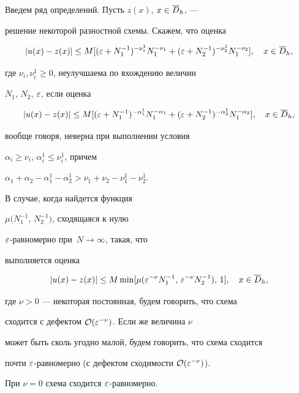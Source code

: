 Введем ряд определений. Пусть $z(x)$, $x\in\overline{D}_h$, ---


решение некоторой разностной схемы. Скажем, что оценка


$$


|u(x)-z(x)|\le M[(\eps+N_1^{-1})^{-\nu_1^1}


N_1^{-\nu_1}+(\eps+N_2^{-1})^{-\nu_2^1}N_1^{-\nu_2}],


\quad x\in\Dbh,


$$


где  $\nu_i, \nu^1_i \ge 0$, неулучшаема по вхождению величин


$N_1$, $N_2$, $\varepsilon$, если оценка


$$


|u(x)-z(x)|\le M[(\eps+N_1^{-1})^{-\alpha_1^1}


N_1^{-\alpha_1}+(\eps+N_2^{-1})^{-\alpha_2^1}N_1^{-\alpha_2}


], \quad x\in\Dbh,


$$


вообще говоря, неверна при выполнении условия


$\alpha_i\ge \nu_i$, $\alpha_i^1\le \nu_i^1$, причем


$\alpha_1+\alpha_2-\alpha_1^1-\alpha_2^1>


\nu_1+\nu_2-\nu_1^1-\nu_2^1$.


В случае, когда найдется функция


$\mu\big(N_1^{-1},\,N_2^{-1}\big)$, сходящаяся к нулю


$\varepsilon$-равномерно при $\,N\to\infty$, такая, что


выполняется оценка


$$


|u(x)-z(x)|\le M\min[


\mu(\eps^{-\nu} N_1^{-1}, \, \eps^{-\nu} N_2^{-1}),\,


1], \quad x\in\Dbh,


$$


где $\nu>0$ --- некоторая постоянная, будем говорить, что схема


сходится с дефектом ${\cal O} (\varepsilon^{-\nu})$. Если же величина $\nu$


может быть сколь угодно малой, будем говорить, что схема сходится


почти $\varepsilon$-равномерно (с дефектом сходимости ${\cal O} (\varepsilon^{-\nu})$).


При $\nu=0$ схема сходится $\varepsilon$-равномерно.





